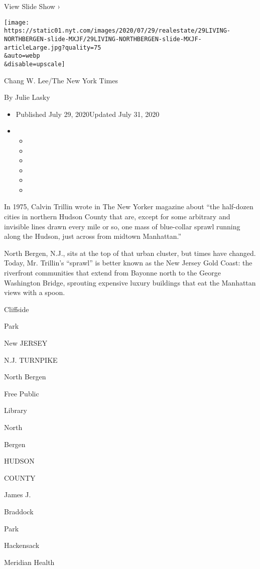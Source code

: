 View Slide Show ›

\texttt{[image: https://static01.nyt.com/images/2020/07/29/realestate/29LIVING-NORTHBERGEN-slide-MXJF/29LIVING-NORTHBERGEN-slide-MXJF-articleLarge.jpg?quality=75\\\&auto=webp\\\&disable=upscale]}

Chang W. Lee/The New York Times

By Julie Lasky

\begin{itemize}
\item
  Published July 29, 2020Updated July 31, 2020
\item
  \begin{itemize}
  \item
  \item
  \item
  \item
  \item
  \item
  \end{itemize}
\end{itemize}

In 1975, Calvin Trillin wrote in The New Yorker magazine about ``the
half-dozen cities in northern Hudson County that are, except for some
arbitrary and invisible lines drawn every mile or so, one mass of
blue-collar sprawl running along the Hudson, just across from midtown
Manhattan.''

North Bergen, N.J., sits at the top of that urban cluster, but times
have changed. Today, Mr. Trillin's ``sprawl'' is better known as the New
Jersey Gold Coast: the riverfront communities that extend from Bayonne
north to the George Washington Bridge, sprouting expensive luxury
buildings that eat the Manhattan views with a spoon.

Cliffside

Park

New JERSEY

N.J. TURNPIKE

North Bergen

Free Public

Library

North

Bergen

HUDSON

COUNTY

James J.

Braddock

Park

Hackensack

Meridian Health

